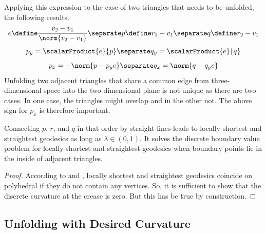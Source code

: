 \documentclass{stdlocal}
\begin{document}
Applying this expression to the case of two triangles that needs to be unfolded, the following results.
\[
  e \define \frac{v_2 - v_1}{\norm{v_2 - v_1}}
  \separate
  p \define r_1 - v_1
  \separate
  q \define r_2 - v_1
\]
\[
  p_y = \scalarProduct{e}{p}
  \separate
  q_y = \scalarProduct{e}{q}
\]
\[
  p_x = -\norm{p - p_y e}
  \separate
  q_x = \norm{q - q_y e}
\]
Unfolding two adjacent triangles that share a common edge from three-dimensional space into the two-dimensional plane is not unique as there are two cases.
In one case, the triangles might overlap and in the other not.
The above sign for $p_x$ is therefore important.

\begin{lemma}
  Connecting $p$, $r$, and $q$ in that order by straight lines leads to locally shortest and straightest geodesics as long as $λ\in (0,1)$.
  It solves the discrete boundary value problem for locally shortest and straightest geodesics when boundary points lie in the inside of adjacent triangles.
\end{lemma}
\begin{proof}
  According to \textcite{polthier2006} and \textcite{martinez2005}, locally shortest and straightest geodesics coincide on polyhedral if they do not contain any vertices.
  So, it is sufficient to show that the discrete curvature at the crease is zero.
  But this has be true by construction.
\end{proof}

\subsection{Unfolding with Desired Curvature} %
\label{sub:unfolding_with_desired_curvature}
\end{document}
